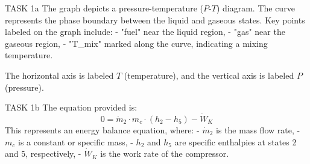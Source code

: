 TASK 1a  
The graph depicts a pressure-temperature (\(P\)-\(T\)) diagram. The curve represents the phase boundary between the liquid and gaseous states. Key points labeled on the graph include:  
- "fuel" near the liquid region,  
- "gas" near the gaseous region,  
- "T_{mix}" marked along the curve, indicating a mixing temperature.  

The horizontal axis is labeled \(T\) (temperature), and the vertical axis is labeled \(P\) (pressure).  

TASK 1b  
The equation provided is:  
\[
0 = \dot{m}_2 \cdot m_c \cdot (h_2 - h_5) - \dot{W}_K
\]  
This represents an energy balance equation, where:  
- \(\dot{m}_2\) is the mass flow rate,  
- \(m_c\) is a constant or specific mass,  
- \(h_2\) and \(h_5\) are specific enthalpies at states 2 and 5, respectively,  
- \(\dot{W}_K\) is the work rate of the compressor.